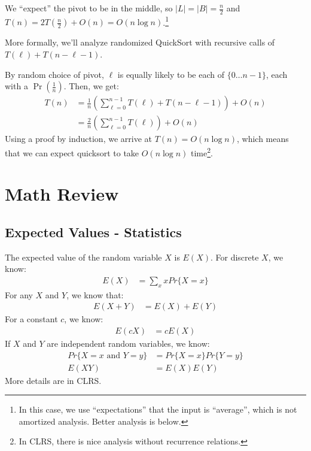             We ``expect'' the pivot to be in the middle, so $|L| = |B| = \frac{n}{2}$ and $T(n) = 2 T(\frac{n}{2}) + O(n) = O(n \log n)$.\footnote{In this case, we use ``expectations'' that the input is ``average'', which is not amortized analysis. Better analysis is below.}

            More formally, we'll analyze randomized QuickSort with recursive calls of $T(\ell) + T(n - \ell - 1)$.

            By random choice of pivot, $\ell$ is equally likely to be each of $\{0 \ldots n-1\}$, each with a $\Pr(\frac{1}{n})$.
            Then, we get:
            \begin{align*}
                T(n) &= \frac{1}{n} \left(\sum^{n-1}_{\ell = 0} T(\ell) + T(n - \ell - 1)\right) + O(n) \\
                &= \frac{2}{n} \left(\sum^{n-1}_{\ell = 0} T(\ell)\right) + O(n)
            \end{align*}
            Using a proof by induction, we arrive at $T(n) = O(n \log n)$, which means that we can expect quicksort to take $O(n \log n)$ time\footnote{In CLRS, there is nice analysis without recurrence relations.}.

    \chapter{Math Review} %
    \label{cha:math_review}
        \section{Expected Values - Statistics} %
        \label{sec:expected_values_statistics}
            The expected value of the random variable $X$ is $E(X)$.
            For discrete $X$, we know:
            \begin{align*}
                E(X) &= \sum_x xPr\{X = x\}
            \end{align*}
            For any $X$ and $Y$, we know that:
            \begin{align*}
                E(X + Y) &= E(X) + E(Y)
            \end{align*}
            For a constant $c$, we know:
            \begin{align*}
                E(cX) &= cE(X)
            \end{align*}
            If $X$ and $Y$ are independent random variables, we know:
            \begin{align*}
                Pr\{X = x \text{ and } Y = y\} &= Pr\{X = x\} Pr\{Y = y\} \\
                E(XY) &= E(X) E(Y)
            \end{align*}
            More details are in CLRS.
